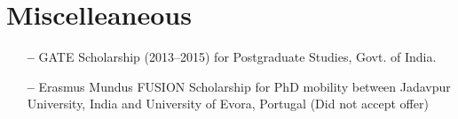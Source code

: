 \section{Miscelleaneous}
\begin{itemize}[leftmargin=10pt, noitemsep]
    \item[\textbf{--}] GATE Scholarship (2013--2015) for Postgraduate Studies, Govt. of India.
    \item[\textbf{--}] Erasmus Mundus FUSION Scholarship for PhD mobility between Jadavpur University, India and University of Evora, Portugal (Did not accept offer)
\end{itemize}
